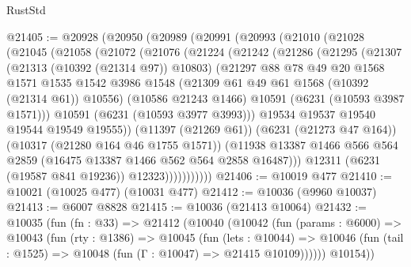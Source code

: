 \begin{lexlean}{RustStd}
\begin{coremodule}
{{@21405 := @20928
    (@20950
      (@20989
        (@20991
          (@20993
            (@21010
              (@21028
                (@21045
                  (@21058
                    (@21072
                      (@21076
                        (@21224
                          (@21242
                            (@21286
                              (@21295
                                (@21307
                                  (@21313 (@10392 (@21314 @97)) @10803)
                                  (@21297
                                    @88
                                    @78
                                    @49
                                    @20
                                    @1568
                                    @1571
                                    @1535
                                    @1542
                                    @3986
                                    @1548
                                    (@21309 @61 @49 @61 @1568 (@10392 (@21314 @61)) @10556)
                                    (@10586 @21243 @1466)
                                    @10591
                                    (@6231 (@10593 @3987 @1571)))
                                  @10591
                                  (@6231 (@10593 @3977 @3993)))
                                @19534
                                @19537
                                @19540
                                @19544
                                @19549
                                @19555))
                            (@11397 (@21269 @61))
                            (@6231 (@21273 @47 @164))
                            (@10317 (@21280 @164 @46 @1755 @1571))
                            (@11938
                              @13387
                              @1466
                              @566
                              @564
                              @2859
                              (@16475 @13387 @1466 @562 @564 @2858 @16487)))
                          @12311
                          (@6231 (@19587 @841 @19236))
                          @12323)))))))))))
@21406 := @10019 @477
@21410 := @10021 (@10025 @477) (@10031 @477)
@21412 := @10036 (@9960 @10037)
@21413 := @6007 @8828
@21415 := @10036 (@21413 @10064)
@21432 := @10035
    (fun (fn : @33) =>
    @21412
      (@10040
        (@10042
          (fun (params : @6000) =>
          @10043
            (fun (rty : @1386) =>
            @10045
              (fun (lets : @10044) =>
              @10046 (fun (tail : @1525) => @10048 (fun (Γ : @10047) => @21415 @10109))))))
        @10154))
}}
\end{coremodule}
\end{lexlean}
